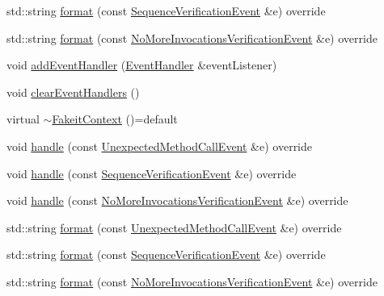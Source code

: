 \begin{DoxyCompactItemize}
\item 
std\+::string \mbox{\hyperlink{structfakeit_1_1FakeitContext_af163c4c51929ef14c1c5529f2f42c40b}{format}} (const \mbox{\hyperlink{structfakeit_1_1SequenceVerificationEvent}{Sequence\+Verification\+Event}} \&e) override
\item 
std\+::string \mbox{\hyperlink{structfakeit_1_1FakeitContext_a49fae6e849a57fff6906a1a313fb4267}{format}} (const \mbox{\hyperlink{structfakeit_1_1NoMoreInvocationsVerificationEvent}{No\+More\+Invocations\+Verification\+Event}} \&e) override
\item 
void \mbox{\hyperlink{structfakeit_1_1FakeitContext_a176ad0df1fcb2758648f2c9b6c8fdd0d}{add\+Event\+Handler}} (\mbox{\hyperlink{structfakeit_1_1EventHandler}{Event\+Handler}} \&event\+Listener)
\item 
void \mbox{\hyperlink{structfakeit_1_1FakeitContext_a65960b8d910f35fa5c3f596f693e5c17}{clear\+Event\+Handlers}} ()
\item 
virtual \mbox{\hyperlink{structfakeit_1_1FakeitContext_adfad726870dfba97246a9ddfddd3a3d5}{$\sim$\+Fakeit\+Context}} ()=default
\item 
void \mbox{\hyperlink{structfakeit_1_1FakeitContext_ac39067234f37a88f6c19440df0bc1b32}{handle}} (const \mbox{\hyperlink{structfakeit_1_1UnexpectedMethodCallEvent}{Unexpected\+Method\+Call\+Event}} \&e) override
\item 
void \mbox{\hyperlink{structfakeit_1_1FakeitContext_a6b77f1360c9f8f4165e1152173789d6e}{handle}} (const \mbox{\hyperlink{structfakeit_1_1SequenceVerificationEvent}{Sequence\+Verification\+Event}} \&e) override
\item 
void \mbox{\hyperlink{structfakeit_1_1FakeitContext_a09e2d757900d3c49a1b17694fa0395f1}{handle}} (const \mbox{\hyperlink{structfakeit_1_1NoMoreInvocationsVerificationEvent}{No\+More\+Invocations\+Verification\+Event}} \&e) override
\item 
std\+::string \mbox{\hyperlink{structfakeit_1_1FakeitContext_a4da398d63e45c922606bbd5aaff30f6e}{format}} (const \mbox{\hyperlink{structfakeit_1_1UnexpectedMethodCallEvent}{Unexpected\+Method\+Call\+Event}} \&e) override
\item 
std\+::string \mbox{\hyperlink{structfakeit_1_1FakeitContext_af163c4c51929ef14c1c5529f2f42c40b}{format}} (const \mbox{\hyperlink{structfakeit_1_1SequenceVerificationEvent}{Sequence\+Verification\+Event}} \&e) override
\item 
std\+::string \mbox{\hyperlink{structfakeit_1_1FakeitContext_a49fae6e849a57fff6906a1a313fb4267}{format}} (const \mbox{\hyperlink{structfakeit_1_1NoMoreInvocationsVerificationEvent}{No\+More\+Invocations\+Verification\+Event}} \&e) override

\end{DoxyCompactItemize}
